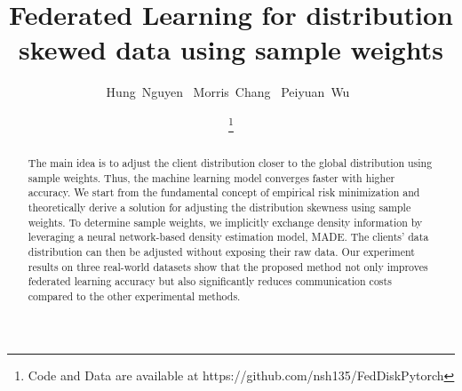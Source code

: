 \documentclass[journal]{IEEEtai}
\newcommand{\MethodnameLong}{Federated Learning for distribution skewed data using sample weights}
\begin{document}
\title{\MethodnameLong}


\author{Hung~Nguyen~
    Morris~Chang~
    Peiyuan~Wu~
}




\author{
		
	
	\thanks{Code and Data are available at https://github.com/nsh135/FedDiskPytorch}
	}

\maketitle
	
\begin{abstract}
 The main idea is to adjust the client distribution closer to the global distribution using sample weights. Thus, the machine learning model converges faster with higher accuracy. We start from the fundamental concept of empirical risk minimization and theoretically derive a solution for adjusting the distribution skewness using sample weights. To determine sample weights, we implicitly exchange density information by leveraging a neural network-based density estimation model, MADE. The clients' data distribution can then be adjusted without exposing their raw data. Our experiment results on three real-world datasets show that the proposed method not only improves federated learning accuracy but also significantly reduces communication costs compared to the other experimental methods.
   
\end{abstract}
\end{document}
